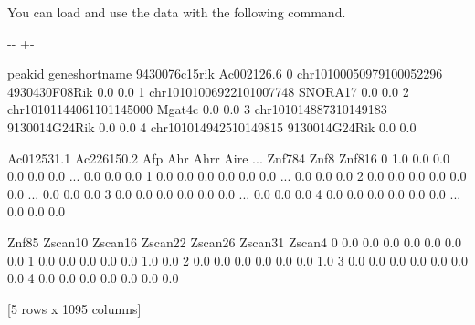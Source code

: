 \documentclass[letterpaper,10pt,english]{sphinxmanual}
\newlength\nbsphinxcodecellspacing
\begin{document}
You can load and use the data with the following command.

{
%
\begin{sphinxVerbatim}[commandchars=\\\{\}]
\llap{\color{nbsphinxin}[8]:\,\hspace{\fboxrule}\hspace{\fboxsep}}
  

\end{sphinxVerbatim}
}

{

\kern-\sphinxverbatimsmallskipamount\kern-\baselineskip
\kern+\FrameHeightAdjust\kern-\fboxrule
\vspace{\nbsphinxcodecellspacing}

%
\begin{sphinxVerbatim}[commandchars=\\\{\}]
\llap{\color{nbsphinxout}[8]:\,\hspace{\fboxrule}\hspace{\fboxsep}}                     peak\PYGZus{}id gene\PYGZus{}short\PYGZus{}name  9430076c15rik  Ac002126.6  \PYGZbs{}
0  chr10\PYGZus{}100050979\PYGZus{}100052296   4930430F08Rik            0.0         0.0
1  chr10\PYGZus{}101006922\PYGZus{}101007748         SNORA17            0.0         0.0
2  chr10\PYGZus{}101144061\PYGZus{}101145000          Mgat4c            0.0         0.0
3    chr10\PYGZus{}10148873\PYGZus{}10149183   9130014G24Rik            0.0         0.0
4    chr10\PYGZus{}10149425\PYGZus{}10149815   9130014G24Rik            0.0         0.0

   Ac012531.1  Ac226150.2  Afp  Ahr  Ahrr  Aire  ...  Znf784  Znf8  Znf816  \PYGZbs{}
0         1.0         0.0  0.0  0.0   0.0   0.0  ...     0.0   0.0     0.0
1         0.0         0.0  0.0  0.0   0.0   0.0  ...     0.0   0.0     0.0
2         0.0         0.0  0.0  0.0   0.0   0.0  ...     0.0   0.0     0.0
3         0.0         0.0  0.0  0.0   0.0   0.0  ...     0.0   0.0     0.0
4         0.0         0.0  0.0  0.0   0.0   0.0  ...     0.0   0.0     0.0

   Znf85  Zscan10  Zscan16  Zscan22  Zscan26  Zscan31  Zscan4
0    0.0      0.0      0.0      0.0      0.0      0.0     0.0
1    0.0      0.0      0.0      0.0      0.0      1.0     0.0
2    0.0      0.0      0.0      0.0      0.0      0.0     1.0
3    0.0      0.0      0.0      0.0      0.0      0.0     0.0
4    0.0      0.0      0.0      0.0      0.0      0.0     0.0

[5 rows x 1095 columns]
\end{sphinxVerbatim}
}
\end{document}
